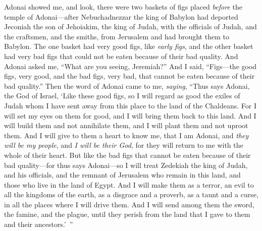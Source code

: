 \begin{biblechapter} %
 Adonai showed me, and look, there were two baskets of figs placed \textit{before} the temple of Adonai—after Nebuchadnezzar the king of Babylon had deported Jeconiah the son of Jehoiakim, the king of Judah, with the officials of Judah, and the craftsmen, and the smiths, from Jerusalem and had brought them to Babylon.
\verse The one basket had very good figs, like \textit{early figs}, and the other basket had very bad figs that could not be eaten because of their bad quality.
\verse And Adonai asked me, “What are you seeing, Jeremiah?” And I said, “Figs—the good figs, very good, and the bad figs, very bad, that cannot be eaten because of their bad quality.”
\verse Then the word of Adonai came to me, \textit{saying},
\verse “Thus says Adonai, the God of Israel, ‘Like these good figs, so I will regard as good the exiles of Judah whom I have sent away from this place to the land of the Chaldeans.
\verse For I will set my eyes on them for good, and I will bring them back to this land. And I will build them and not annihilate them, and I will plant them and not uproot them.
\verse And I will give to them a heart to know me, that I am Adonai, and \textit{they will be my people}, and \textit{I will be their God}, for they will return to me with the whole of their heart.
\verse But like the bad figs that cannot be eaten because of their bad quality—for thus says Adonai—so I will treat Zedekiah the king of Judah, and his officials, and the remnant of Jerusalem who remain in this land, and those who live in the land of Egypt.
\verse And I will make them as a terror, an evil to all the kingdoms of the earth, as a disgrace and a proverb, as a taunt and a curse, in all the places where I will drive them.
\verse And I will send among them the sword, the famine, and the plague, until they perish from the land that I gave to them and their ancestors.’ ”
\end{biblechapter}

